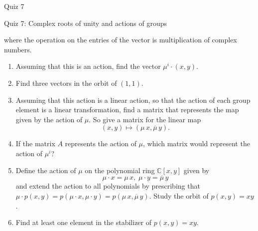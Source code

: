 \documentclass[12pt]{article}
\begin{document}
\begin{quiz}{Quiz 7}
\begin{essay}[response field lines=5,attachments allowed=0]{Quiz 7: Complex roots of unity and actions of groups}
\begin{enumerate}
where the operation on the entries of the vector is multiplication of complex numbers.
\begin{enumerate}
\item Assuming that this is an action, find the vector $\mu^i \cdotp (x , y)$.
\item Find three vectors in the orbit of $(1,1)$.
\item Assuming that this action is a linear action, so that the action of each group element is a linear transformation, find a matrix that represents the map given by the action of $\mu $. So give a matrix for the linear map 
\[  (x , y) \mapsto  (\mu \,  x , \overline{\mu} \,   y). \]
\item If the matrix $A$ represents the action of $\mu$, which matrix would represent the action of $\mu^i$?
\item Define the action of $\mu $ on the polynomial ring $\mathbb{C}[x,y]$ given by 
\[ \mu  \cdotp x = \mu \,  x , \; \mu  \cdotp y = \overline{\mu} \,   y \]
and extend the action to all polynomials by prescribing that $\mu  \cdotp p(x,y) = p(\mu  \cdotp x, \mu  \cdotp y) = p(\mu\,   x , \overline{\mu} \,   y)$. Study the orbit of $p(x,y)=xy$.
\item Find at least one element in the stabilizer of  $p(x,y)=xy$.
    \end{enumerate} 
    \end{enumerate}
\end{essay}
\end{quiz}
\end{document}
